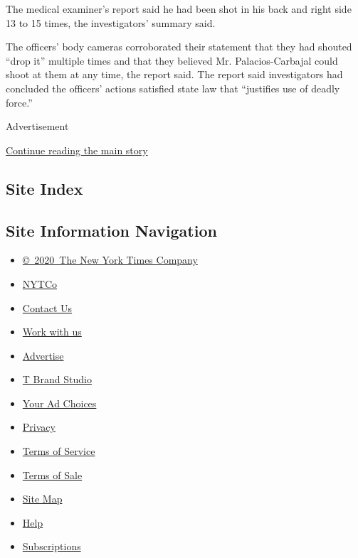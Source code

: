 The medical examiner's report said he had been shot in his back and
right side 13 to 15 times, the investigators' summary said.

The officers' body cameras corroborated their statement that they had
shouted ``drop it'' multiple times and that they believed Mr.
Palacios-Carbajal could shoot at them at any time, the report said. The
report said investigators had concluded the officers' actions satisfied
state law that ``justifies use of deadly force.''

Advertisement

\protect\hyperlink{after-bottom}{Continue reading the main story}

\hypertarget{site-index}{%
\subsection{Site Index}\label{site-index}}

\hypertarget{site-information-navigation}{%
\subsection{Site Information
Navigation}\label{site-information-navigation}}

\begin{itemize}
\tightlist
\item
  \href{https://help.nytimes3xbfgragh.onion/hc/en-us/articles/115014792127-Copyright-notice}{©~2020~The
  New York Times Company}
\end{itemize}

\begin{itemize}
\tightlist
\item
  \href{https://www.nytco.com/}{NYTCo}
\item
  \href{https://help.nytimes3xbfgragh.onion/hc/en-us/articles/115015385887-Contact-Us}{Contact
  Us}
\item
  \href{https://www.nytco.com/careers/}{Work with us}
\item
  \href{https://nytmediakit.com/}{Advertise}
\item
  \href{http://www.tbrandstudio.com/}{T Brand Studio}
\item
  \href{https://www.nytimes3xbfgragh.onion/privacy/cookie-policy\#how-do-i-manage-trackers}{Your
  Ad Choices}
\item
  \href{https://www.nytimes3xbfgragh.onion/privacy}{Privacy}
\item
  \href{https://help.nytimes3xbfgragh.onion/hc/en-us/articles/115014893428-Terms-of-service}{Terms
  of Service}
\item
  \href{https://help.nytimes3xbfgragh.onion/hc/en-us/articles/115014893968-Terms-of-sale}{Terms
  of Sale}
\item
  \href{https://spiderbites.nytimes3xbfgragh.onion}{Site Map}
\item
  \href{https://help.nytimes3xbfgragh.onion/hc/en-us}{Help}
\item
  \href{https://www.nytimes3xbfgragh.onion/subscription?campaignId=37WXW}{Subscriptions}
\end{itemize}
